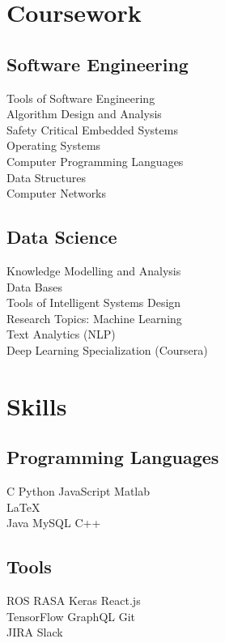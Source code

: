 \documentclass[]{deedy-resume-openfont}
\begin{document}
\begin{minipage}[t]{0.33\textwidth}

\section{Coursework}
\subsection{Software Engineering}
Tools of Software Engineering \\
Algorithm Design and Analysis\\
Safety Critical Embedded Systems \\
Operating Systems \\
Computer Programming Languages \\
Data Structures \\
Computer Networks \\
\sectionsep

\subsection{Data Science}
Knowledge Modelling and Analysis \\
Data Bases \\
Tools of Intelligent Systems Design \\
Research Topics: Machine Learning \\
Text Analytics (NLP) \\
Deep Learning Specialization (Coursera)
\sectionsep


\section{Skills}
\subsection{Programming Languages}
\textbullet{} C \textbullet{} Python \textbullet{} JavaScript \textbullet{} Matlab \\
\textbullet{} \LaTeX\ \\ 
\textbullet{} Java \textbullet{} MySQL \textbullet{} C++
\sectionsep
\subsection{Tools}
\textbullet{} ROS \textbullet{} RASA \textbullet{}  Keras \textbullet{} React.js \\ \textbullet{} TensorFlow 
\textbullet{} GraphQL \textbullet{} Git \\ 
\textbullet{} JIRA \textbullet{} Slack\\

\sectionsep

%
%

\end{minipage} 
\end{document}
